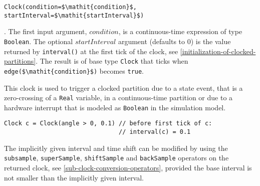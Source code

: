 \begin{operatordefinition*}[Clock]\label{modelica:clock-event}
\begin{synopsis}\begin{lstlisting}
Clock(condition=$\mathit{condition}$, startInterval=$\mathit{startInterval}$)
\end{lstlisting}\end{synopsis}
\begin{semantics}
.  The first input argument, $\mathit{condition}$, is a continuous-time expression of type \lstinline!Boolean!.  The optional $\mathit{startInterval}$ argument (defaults to 0) is the value returned by \lstinline!interval()! at the first tick of the clock, see \cref{initialization-of-clocked-partitions}.  The result is of base type \lstinline!Clock! that ticks when \lstinline!edge($\mathit{condition}$)! becomes \lstinline!true!.
\begin{nonnormative}
This clock is used to trigger a clocked partition due to a state event, that is a zero-crossing of a \lstinline!Real! variable, in a continuous-time partition or due to a hardware interrupt that is modeled as \lstinline!Boolean! in the simulation model.
\end{nonnormative}

\begin{example}
\begin{lstlisting}[language=modelica]
Clock c = Clock(angle > 0, 0.1) // before first tick of c:
                                // interval(c) = 0.1
\end{lstlisting}
\end{example}

\begin{nonnormative}
The implicitly given interval and time shift can be modified by using the \lstinline!subsample!, \lstinline!superSample!, \lstinline!shiftSample! and \lstinline!backSample! operators on the returned clock, see \cref{sub-clock-conversion-operators}, provided the base interval is not smaller than the implicitly given interval.
\end{nonnormative}
\end{semantics}
\end{operatordefinition*}

